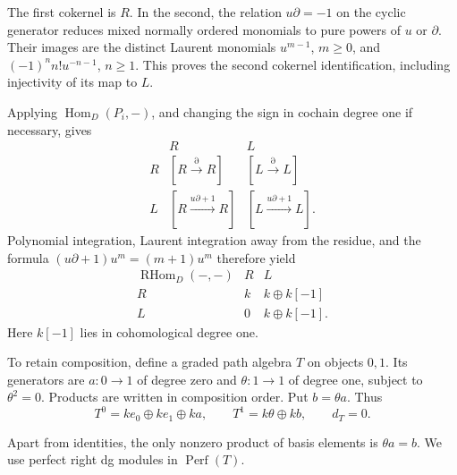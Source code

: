 The first cokernel is \(R\).  In the second, the relation
\(u\partial=-1\) on the cyclic generator reduces mixed normally ordered
monomials to pure powers of \(u\) or \(\partial\).
Their images are the distinct Laurent monomials
\(u^{m-1}\), \(m\geq0\), and \((-1)^n n!u^{-n-1}\), \(n\geq1\).
This proves the second cokernel identification, including injectivity of
its map to \(L\).

Applying \(\operatorname{Hom}_D(P_i,-)\), and changing the sign in
cochain degree one if necessary, gives
\[
\begin{array}{c|cc}
 &R&L\\\hline
 R &[R\xrightarrow{\partial}R]&[L\xrightarrow{\partial}L]\\
 L &[R\xrightarrow{u\partial+1}R]&[L\xrightarrow{u\partial+1}L].
\end{array}
\]
Polynomial integration, Laurent integration away from the residue, and
the formula \((u\partial+1)u^m=(m+1)u^m\) therefore yield
\begin{equation}\label{cbc:rc:eq:corners}
\begin{array}{c|cc}
 \operatorname{RHom}_D(-,-)&R&L\\\hline
 R &k&k\oplus k[-1]\\
 L &0&k\oplus k[-1].
\end{array}
\end{equation}
Here \(k[-1]\) lies in cohomological degree one.

To retain composition, define a graded path algebra \(T\) on objects
\(0,1\). Its generators are \(a:0\to1\) of degree zero and
\(\theta:1\to1\) of degree one, subject to \(\theta^2=0\).
Products are written in composition order.  Put \(b=\theta a\).
Thus
\[
 T^0=k e_0\oplus k e_1\oplus k a,\qquad
 T^1=k\theta\oplus k b,\qquad d_T=0.
\]

Apart from identities, the only nonzero product of basis elements is
\(\theta a=b\).
We use perfect right dg modules in \(\operatorname{Perf}(T)\).

